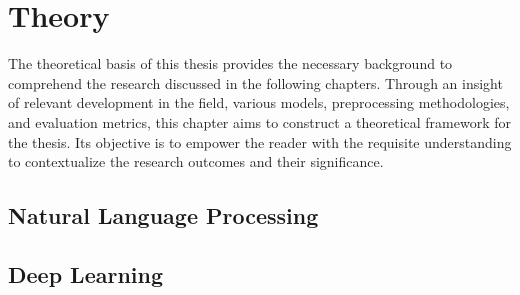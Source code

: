 \chapter{Theory}

The theoretical basis of this thesis provides the necessary background to comprehend the research discussed in the following chapters. Through an insight of relevant development in the field, various models, preprocessing methodologies, and evaluation metrics, this chapter aims to construct a theoretical framework for the thesis. Its objective is to empower the reader with the requisite understanding to contextualize the research outcomes and their significance.

\section{Natural Language Processing}

\Blindtext[4][1]

\section{Deep Learning}

\Blindtext[4][1]
